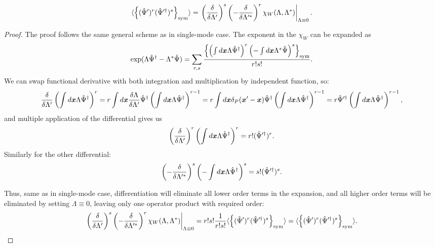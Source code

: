 \begin{lemma}
\label{lmm:formalism:func-wigner:moments-from-chi}
\[
	\langle \left\{  (\hat{\Psi}^\prime)^r (\hat{\Psi}^{\prime\dagger})^s  \right\}_{\mathrm{sym}} \rangle
	= \left.
		\left( \frac{\delta}{\delta \Lambda^\prime} \right)^s
		\left( -\frac{\delta}{\delta \Lambda^{\prime*}} \right)^r
		\chi_W (\Lambda, \Lambda^*)
	\right|_{\Lambda \equiv 0}.
\]
\end{lemma}
\begin{proof}
The proof follows the same general scheme as in single-mode case.
The exponent in the $\chi_W$ can be expanded as
\[
	\exp (\Lambda \hat{\Psi}^\dagger - \Lambda^* \hat{\Psi})
	= \sum\limits_{r,s}
		\frac{
			\left\{ 
				\left( \int d\boldsymbol{x} \Lambda \hat{\Psi}^\dagger \right)^r
				\left( -\int d\boldsymbol{x} \Lambda^* \hat{\Psi} \right)^s
			 \right\}_{\mathrm{sym}}
		}
		{r!s!}.
\]
We can swap functional derivative with both integration and multiplication by independent function, so:
\[
	\frac{\delta}{\delta \Lambda^\prime} \left( \int d\boldsymbol{x} \Lambda \hat{\Psi}^\dagger \right)^r
	= r \int d\boldsymbol{x} \frac{\delta \Lambda}{\delta \Lambda^\prime} \hat{\Psi}^\dagger
		\left( \int d\boldsymbol{x} \Lambda \hat{\Psi}^\dagger \right)^{r-1}
	= r \int d\boldsymbol{x} \delta_P(\boldsymbol{x}^\prime - \boldsymbol{x}) \hat{\Psi}^\dagger
		\left( \int d\boldsymbol{x} \Lambda \hat{\Psi}^\dagger \right)^{r-1}
	= r \hat{\Psi}^{\prime\dagger} \left( \int d\boldsymbol{x} \Lambda \hat{\Psi}^\dagger \right)^{r-1},
\]
and multiple application of the differential gives us
\[
	\left( \frac{\delta}{\delta \Lambda^\prime} \right)^r
	\left( \int d\boldsymbol{x} \Lambda \hat{\Psi}^\dagger \right)^r
	= r! ( \hat{\Psi}^{\prime\dagger} )^r.
\]
Similarly for the other differential:
\[
	\left( -\frac{\delta}{\delta \Lambda^{\prime*}} \right)^s
	\left( -\int d\boldsymbol{x} \Lambda \hat{\Psi}^\dagger \right)^s
	= s! ( \hat{\Psi}^{\prime\dagger} )^s.
\]

Thus, same as in single-mode case,
differentiation will eliminate all lower order terms in the expansion,
and all higher order terms will be eliminated by setting $\Lambda \equiv 0$,
leaving only one operator product with required order:
\[
	\left.
		\left( \frac{\delta}{\delta \Lambda^\prime} \right)^s
		\left( -\frac{\delta}{\delta \Lambda^{\prime*}} \right)^r
		\chi_W (\Lambda, \Lambda^*)
	\right|_{\Lambda \equiv 0}
	= r! s! \frac{1}{r! s!}
		\langle \left\{  (\hat{\Psi}^\prime)^r (\hat{\Psi}^{\prime\dagger})^s  \right\}_{\mathrm{sym}} \rangle
	= \langle \left\{  (\hat{\Psi}^\prime)^r (\hat{\Psi}^{\prime\dagger})^s  \right\}_{\mathrm{sym}} \rangle.
	\qedhere
\]
\end{proof}

